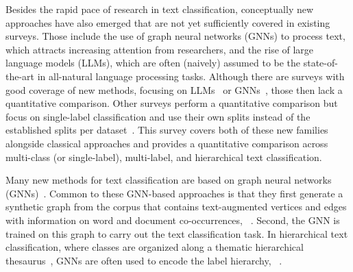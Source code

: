 \documentclass[acmsmall,nonacm]{acmart}
\begin{document}
Besides the rapid pace of research in text classification, conceptually new approaches have also emerged that are not yet sufficiently covered in existing surveys. Those include the use of graph neural networks (GNNs) to process text, which attracts increasing attention from researchers, and the rise of large language models (LLMs), which are often (naively) assumed to be the state-of-the-art in all-natural language processing tasks. 
Although there are surveys with good coverage of new methods, \eg focusing on LLMs~\cite{DBLP:journals/tkde/HuLZHNL24} or GNNs~\cite{gnns-for-nlp-survey}, those then lack a quantitative comparison. 
Other surveys perform a quantitative comparison but focus on single-label classification and use their own splits instead of the established splits per dataset~\cite{DBLP:journals/eswa/ReusensSTSVBB24}.
This survey covers both of these new families alongside classical approaches and provides a quantitative comparison across multi-class (or single-label), multi-label, and hierarchical text classification.

Many new methods for text classification are based on graph neural networks (GNNs)~\cite{book:hamilton:grl}.
Common to these GNN-based approaches is that they first generate a synthetic graph from the corpus that contains text-augmented vertices and edges with information on word and document co-occurrences, \eg~\cite{DBLP:conf/aaai/YaoM019,texting_acl2020}. 
Second, the GNN is trained on this graph to carry out the text classification task.
In hierarchical text classification, where classes are organized along a thematic hierarchical thesaurus~\cite{DBLP:journals/csur/Sebastiani02}, GNNs are often used to encode the label hierarchy, \eg~\cite{hbgl,DBLP:conf/acl/WangWH0W22}.
\end{document}

